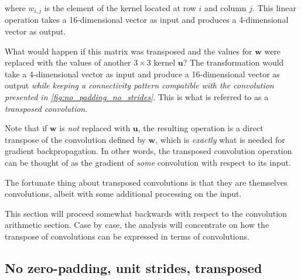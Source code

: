 \documentclass{article}
\begin{document}
where $w_{i,j}$ is the element of the kernel located at row $i$ and column $j$.
This linear operation takes a 16-dimensional vector as input and produces a
4-dimensional vector as output.

What would happen if this matrix was transposed and the values for $\mathbf{w}$
were replaced with the values of another $3 \times 3$ kernel $\mathbf{u}$? The
transformation would take a 4-dimensional vector as input and produce a
16-dimensional vector as output {\em while keeping a connectivity pattern
compatible with the convolution presented in
\autoref{fig:no_padding_no_strides}}. This is what is referred to as a {\em
transposed convolution}.

Note that if $\mathbf{w}$ is {\em not} replaced with $\mathbf{u}$, the resulting
operation is a direct transpose of the convolution defined by $\mathbf{w}$,
which is {\em exactly} what is needed for gradient backpropagation. In other
words, the transposed convolution operation can be thought of as the gradient of
{\em some} convolution with respect to its input.

The fortunate thing about transposed convolutions is that they are themselves
convolutions, albeit with some additional processing on the input.

This section will proceed somewhat backwards with respect to the convolution
arithmetic section. Case by case, the analysis will concentrate on how the
transpose of convolutions can be expressed in terms of convolutions.

\subsection{No zero-padding, unit strides, transposed}
\end{document}

